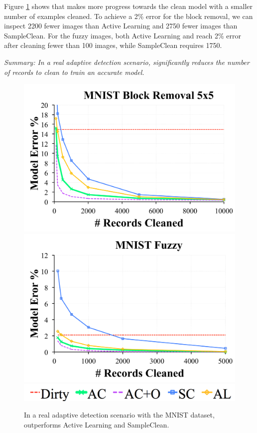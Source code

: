 Figure \ref{mnist} shows that \sys makes more progress towards the clean model with a smaller number of examples cleaned.
To achieve a 2\% error for the block removal, we can inspect 2200 fewer images than Active Learning and 2750 fewer images than SampleClean.
For the fuzzy images, both Active Learning and \sys reach 2\% error after cleaning fewer than 100 images, while SampleClean requires 1750.

\vspace{0.25em}

\noindent \emph{Summary: In a real adaptive detection scenario, \sys significantly reduces the number of records to clean to train an accurate model. }

\begin{figure}[ht]
\centering\vspace{-0.5em}
 \includegraphics[width=0.49\columnwidth]{exp/exp7a.pdf}
 \includegraphics[width=0.49\columnwidth]{exp/exp7b.pdf}
 \includegraphics[width=0.49\columnwidth]{exp/legend-general.png}\vspace{-0.5em}
 \caption{In a real adaptive detection scenario with the MNIST dataset, \sys outperforms Active Learning and SampleClean.  \label{mnist}}
\end{figure}
